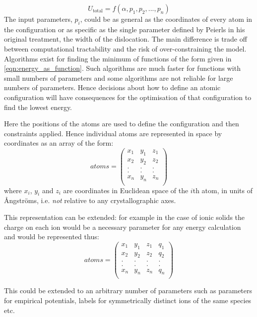 \begin{equation}
U_{\text{total}} = f(\alpha, p_1, p_2,...,p_n )
\label{eqn:energy_as_function}
\end{equation}
The input parameters, $p_i$, could be as general as the coordinates of every atom in the configuration or as specific as the single parameter defined by Peierls in his original treatment, the width of the dislocation. The main difference is trade off between computational tractability and the risk of over-constraining the model. Algorithms exist for finding the minimum of functions of the form given in \autoref{eqn:energy_as_function}. Such algorithms are much faster for functions with small numbers of parameters and some algorithms are not reliable for large numbers of parameters. Hence decisions about how to define an atomic configuration will have consequences for the optimisation of that configuration to find the lowest energy.

Here the positions of the atoms are used to define the configuration and then constraints applied. Hence individual atoms are represented in space by coordinates as an array of the form:
$$ atoms = \begin{pmatrix}
x_1 & y_1 & z_1  \\
x_2 & y_2 & z_2  \\
.   &.    &.     \\
.   &.    &.     \\
x_n & y_n & z_n  \\
\end{pmatrix}
$$
where $x_i$, $y_i$ and $z_i$ are coordinates in Euclidean space of the $i$th atom, in units of \r{A}ngstr\"{o}ms, i.e. \emph{not} relative to any crystallographic axes.

This representation can be extended: for example in the case of ionic solids the charge on each ion would be a necessary parameter for any energy calculation and would be represented thus:
$$
atoms = \begin{pmatrix}
x_1 & y_1 & z_1 & q_1 \\
x_2 & y_2 & z_2 & q_2 \\
.   &.    &.    &.    \\
.   &.    &.    &.    \\
x_n & y_n & z_n & q_n \\
\end{pmatrix}
$$

This could be extended to an arbitrary number of parameters such as parameters for empirical potentials, labels for symmetrically distinct ions of the same species etc.





